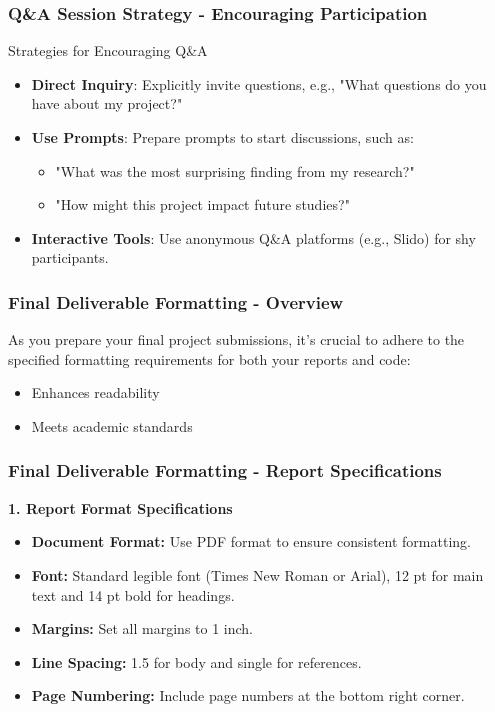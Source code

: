 \documentclass[aspectratio=169]{beamer}
\begin{document}
\begin{frame}[fragile]
    \frametitle{Q\&A Session Strategy - Encouraging Participation}
    \begin{block}{Strategies for Encouraging Q\&A}
        \begin{itemize}
            \item \textbf{Direct Inquiry}: Explicitly invite questions, e.g., "What questions do you have about my project?"
            \item \textbf{Use Prompts}: Prepare prompts to start discussions, such as:
                \begin{itemize}
                    \item "What was the most surprising finding from my research?"
                    \item "How might this project impact future studies?"
                \end{itemize}
            \item \textbf{Interactive Tools}: Use anonymous Q\&A platforms (e.g., Slido) for shy participants.
        \end{itemize}
    \end{block}
\end{frame}

\begin{frame}[fragile]
    \frametitle{Final Deliverable Formatting - Overview}
    As you prepare your final project submissions, it's crucial to adhere to the specified formatting requirements for both your reports and code:
    \begin{itemize}
        \item Enhances readability
        \item Meets academic standards
    \end{itemize}
\end{frame}

\begin{frame}[fragile]
    \frametitle{Final Deliverable Formatting - Report Specifications}
    \textbf{1. Report Format Specifications}
    \begin{itemize}
        \item \textbf{Document Format:} Use PDF format to ensure consistent formatting.
        \item \textbf{Font:} Standard legible font (Times New Roman or Arial), 12 pt for main text and 14 pt bold for headings.
        \item \textbf{Margins:} Set all margins to 1 inch.
        \item \textbf{Line Spacing:} 1.5 for body and single for references.
        \item \textbf{Page Numbering:} Include page numbers at the bottom right corner.
    \end{itemize}
\end{frame}
\end{document}
